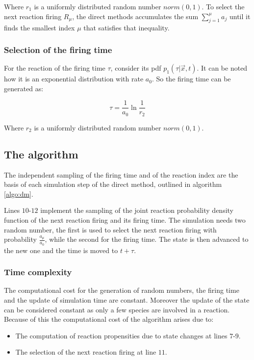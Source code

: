     Where $r_1$ is a uniformly distributed random number $norm(0,1)$.
    To select the next reaction firing $R_\mu$, the direct methods accumulates the sum $\sum\limits_{j=1}^\mu a_j$ until it finds the smallest index $\mu$ that satisfies that inequality.

    \subsubsection{Selection of the firing time}
    For the reaction of the firing time $\tau$, consider its pdf $p_1(\tau|\vec{x},t)$.
    It can be noted how it is an exponential distribution with rate $a_0$.
    So the firing time can be generated as:

    $$\tau = \frac{1}{a_0}\ln\frac{1}{r_2}$$

    Where $r_2$ is a uniformly distributed random number $norm(0,1)$.

  \subsection{The algorithm}
  The independent sampling of the firing time and of the reaction index are the basis of each simulation step of the direct method, outlined in algorithm \ref{algo:dm}.

  

  Lines $10$-$12$ implement the sampling of the joint reaction probability density function of the next reaction firing and its firing time.
  The simulation needs two random number, the first is used to select the next reaction firing with probability $\frac{a_\mu}{a_0}$, while the second for the firing time.
  The state is then advanced to the new one and the time is moved to $t+\tau$.

    \subsubsection{Time complexity}
    The computational cost for the generation of random numbers, the firing time and the update of simulation time are constant.
    Moreover the update of the state can be considered constant as only a few species are involved in a reaction.
    Because of this the computational cost of the algorithm arises due to:

    \begin{multicols}{2}
      \begin{itemize}
        \item The computation of reaction propensities due to state changes at lines $7$-$9$.
        \item The selection of the next reaction firing at line $11$.
      \end{itemize}
    \end{multicols}

